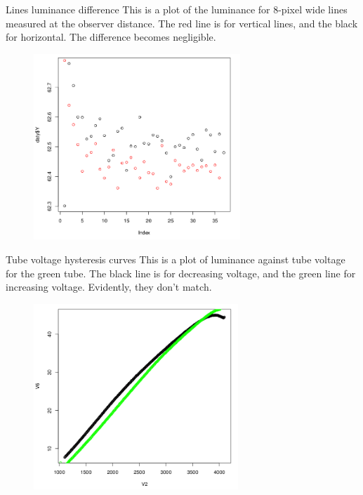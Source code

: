 \documentclass{beamer}
\begin{document}
\begin{frame}[t]{Lines luminance difference}
This is a plot of the luminance for 8-pixel wide lines measured at the observer distance. The red line is for vertical lines, and the black for horizontal. The difference becomes negligible.
\begin{figure}[c]
\includegraphics[height=7cm]{line8dist.png}
\end{figure}
\end{frame}

\begin{frame}[t]{Tube voltage hysteresis curves}
This is a plot of luminance against tube voltage for the green tube. The black line is for decreasing voltage, and the green line for increasing voltage. Evidently, they don't match.
\begin{figure}[c]
\includegraphics[height=7cm]{greenhysteresis.png}
\end{figure}
\end{frame}
\end{document}
